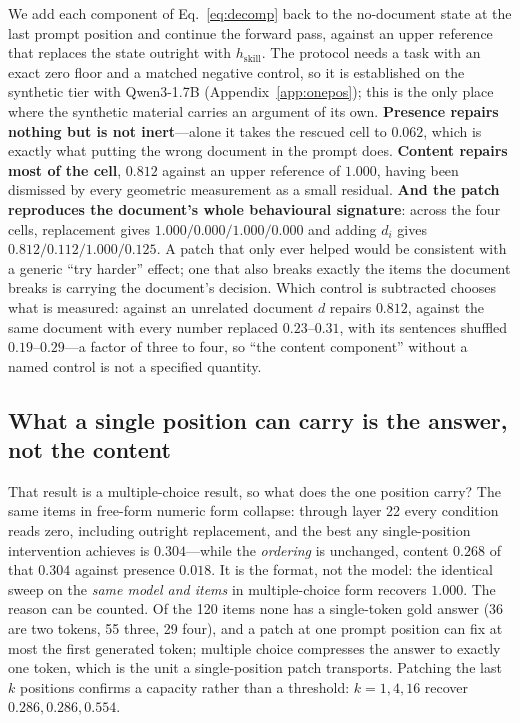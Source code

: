 \documentclass{article}
\newcommand{\dvec}{\ensuremath{d}}
\begin{document}
We add each component of Eq.~\ref{eq:decomp} back to the no-document state at
the last prompt position and continue the forward pass, against an upper
reference that replaces the state outright with $h_{\text{skill}}$. The protocol
needs a task with an exact zero floor and a matched negative control, so it is
established on the synthetic tier with Qwen3-1.7B (Appendix~\ref{app:onepos}); this is the only
place where the synthetic material carries an argument of its own.
\textbf{Presence repairs nothing but is not inert}---alone it takes the rescued
cell to $0.062$, which is exactly what putting the wrong document in the prompt
does. \textbf{Content repairs most of the cell}, $0.812$ against an upper
reference of $1.000$, having been dismissed by every geometric measurement as a
small residual. \textbf{And the patch reproduces the document's whole
behavioural signature}: across the four cells, replacement gives
$1.000/0.000/1.000/0.000$ and adding $\dvec_i$ gives $0.812/0.112/1.000/0.125$.
A patch that only ever helped would be consistent with a generic ``try harder''
effect; one that also breaks exactly the items the document breaks is carrying
the document's decision. Which control is subtracted chooses what is measured:
against an unrelated document $\dvec$ repairs $0.812$, against the same document
with every number replaced $0.23$--$0.31$, with its sentences shuffled
$0.19$--$0.29$---a factor of three to four, so ``the content component'' without a
named control is not a specified quantity.

\subsection{What a single position can carry is the answer, not the content}
\label{sec:onepos}

That result is a multiple-choice result, so what does the one position carry?
The same items in free-form numeric form collapse: through layer 22 every
condition reads zero, including outright replacement, and the best any
single-position intervention achieves is $0.304$---while the \emph{ordering} is
unchanged, content $0.268$ of that $0.304$ against presence $0.018$. It is the
format, not the model: the identical sweep on the \emph{same model and items} in
multiple-choice form recovers $1.000$. The reason can be counted. Of the 120
items none has a single-token gold answer (36 are two tokens, 55 three, 29
four), and a patch at one prompt position can fix at most the first generated
token; multiple choice compresses the answer to exactly one token, which is the
unit a single-position patch transports. Patching the last $k$ positions
confirms a capacity rather than a threshold: $k=1,4,16$ recover
$0.286, 0.286, 0.554$.
\end{document}
